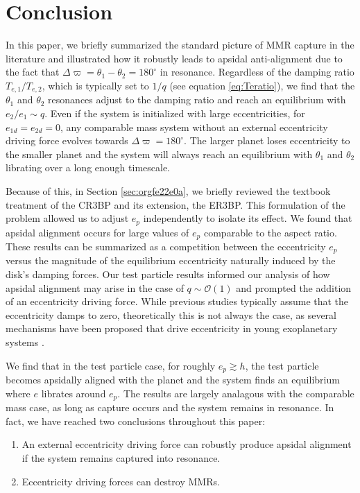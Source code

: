 \documentclass[usenatbib,twocolumn]{mnras}
\begin{document}
\section{Conclusion}
\label{sec:orgba5b3ea}
In this paper, we briefly summarized the standard picture of MMR
capture in the literature and illustrated how it robustly leads to
apsidal anti-alignment due to the fact that
\(\Delta\varpi=\theta_1-\theta_2=180^\circ\) in resonance.  Regardless
of the damping ratio \(T_{e,1}/T_{e,2}\), which is typically set to
\(1/q\) (see equation \eqref{eq:Teratio}), we find that the \(\theta_1\) and
\(\theta_2\) resonances adjust to the damping ratio and reach an
equilibrium with \(e_2/e_1\sim q\).  Even if the system is initialized
with large eccentricities, for \(e_{1d}=e_{2d}=0\), any comparable mass
system without an external eccentricity driving force evolves towards
\(\Delta\varpi=180^\circ\). The larger planet loses eccentricity to the
smaller planet and the system will always reach an equilibrium with
\(\theta_1\) and \(\theta_2\) librating over a long enough timescale.

Because of this, in Section \ref{sec:orgfe22e0a}, we briefly reviewed
the textbook treatment of the CR3BP and its extension, the ER3BP.
This formulation of the problem allowed us to adjust \(e_p\)
independently to isolate its effect.  We found that apsidal alignment
occurs for large values of \(e_p\) comparable to the aspect ratio. These
results can be summarized as a competition between the eccentricity
\(e_p\) versus the magnitude of the equilibrium eccentricity naturally
induced by the disk's damping forces.  Our test particle results
informed our analysis of how apsidal alignment may arise in the case
of \(q\sim\mathcal{O}(1)\) and prompted the addition of an eccentricity
driving force.  While previous studies typically assume that the
eccentricity damps to zero, theoretically this is not always the case,
as several mechanisms have been proposed that drive eccentricity in
young exoplanetary systems
\citep{ragusa17_eccen_evolut_durin_planet_disc_inter,goldreich03_eccen_evolut_planet_gaseous_disks,teyssandier17_secul_evolut_eccen_protop_discs}.

We find that in the test particle case, for roughly \(e_p \gtrsim h\),
the test particle becomes apsidally aligned with the planet and the
system finds an equilibrium where \(e\) librates around \(e_p\).  The
results are largely analagous with the comparable mass case, as long
as capture occurs and the system remains in resonance.  In fact, we
have reached two conclusions throughout this paper:
\begin{enumerate}[label=\arabic*.]
  \item An external eccentricity driving force can robustly produce
apsidal alignment if the system remains captured into resonance.
  \item Eccentricity driving forces can destroy MMRs.
\end{enumerate}
\end{document}
